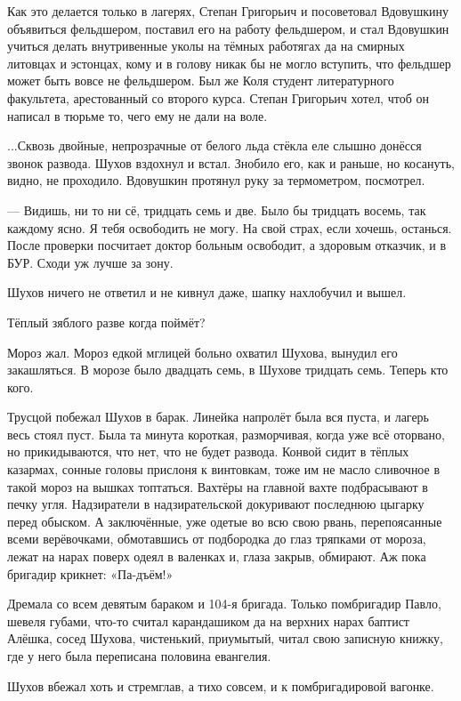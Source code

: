 Как это делается только в лагерях, Степан Григорьич и посоветовал Вдовушкину объявиться
фельдшером, поставил его на работу фельдшером, и стал Вдовушкин учиться делать внутривенные
уколы на тёмных работягах да на смирных литовцах и эстонцах, кому и в голову никак бы не
могло вступить, что фельдшер может быть вовсе не фельдшером. Был же Коля студент
литературного факультета, арестованный со второго курса. Степан Григорьич хотел, чтоб он
написал в тюрьме то, чего ему не дали на воле.

...Сквозь двойные, непрозрачные от белого льда стёкла еле слышно донёсся звонок развода.
Шухов вздохнул и встал. Знобило его, как и раньше, но косануть, видно, не проходило. Вдовушкин
протянул руку за термометром, посмотрел.

--- Видишь, ни то ни сё, тридцать семь и две. Было бы тридцать восемь, так каждому ясно. Я тебя
освободить не могу. На свой страх, если хочешь, останься. После проверки посчитает доктор
больным \dash освободит, а здоровым \dash отказчик, и в БУР. Сходи уж лучше за зону.

Шухов ничего не ответил и не кивнул даже, шапку нахлобучил и вышел.

Тёплый зяблого разве когда поймёт?

Мороз жал. Мороз едкой мглицей больно охватил Шухова, вынудил его закашляться. В морозе было
двадцать семь, в Шухове тридцать семь. Теперь кто кого.

Трусцой побежал Шухов в барак. Линейка напролёт была вся пуста, и лагерь весь стоял пуст.
Была та минута короткая, разморчивая, когда уже всё оторвано, но прикидываются, что нет, что
не будет развода. Конвой сидит в тёплых казармах, сонные головы прислоня к винтовкам, \dash тоже
им не масло сливочное в такой мороз на вышках топтаться. Вахтёры на главной вахте
подбрасывают в печку угля. Надзиратели в надзирательской докуривают последнюю цыгарку
перед обыском. А заключённые, уже одетые во всю свою рвань, перепоясанные всеми верёвочками,
обмотавшись от подбородка до глаз тряпками от мороза, \dash лежат на нарах поверх одеял в
валенках и, глаза закрыв, обмирают. Аж пока бригадир крикнет: «Па-дъём!»

Дремала со всем девятым бараком и 104-я бригада. Только помбригадир Павло, шевеля губами,
что-то считал карандашиком да на верхних нарах баптист Алёшка, сосед Шухова, чистенький,
приумытый, читал свою записную книжку, где у него была переписана половина евангелия.

Шухов вбежал хоть и стремглав, а тихо совсем, и \dash к помбригадировой вагонке.

